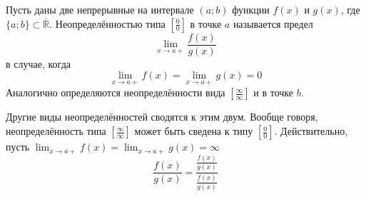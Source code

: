 Пусть даны две непрерывные на интервале $(a; b)$ функции $f(x)$ и $g(x)$, где $\{a; b\} \subset \overline{\mathbb{R}}$. Неопределённостью типа $\left[\frac{0}{0}\right]$ в точке $a$ называется предел 
\[
\lim_{x \to a+}\frac{f(x)}{g(x)}
\]
в случае, когда
\[
\lim_{x \to a+}f(x) = \lim_{x \to a+}g(x) = 0
\]
Аналогично определяются неопределённости вида $\left[\frac{\infty}{\infty}\right]$ и в точке $b$.

Другие виды неопределённостей сводятся к этим двум. Вообще говоря, неопределённость типа $\left[\frac{\infty}{\infty}\right]$ может быть сведена к типу $\left[\frac{0}{0}\right]$. Действительно, пусть
$\lim_{x \to a+}f(x) = \lim_{x \to a+}g(x) = \infty$
\[
\frac{f(x)}{g(x)}=\frac{\frac{f(x)}{g(x)}}{\frac{f(x)}{g(x)}}
\]
 



